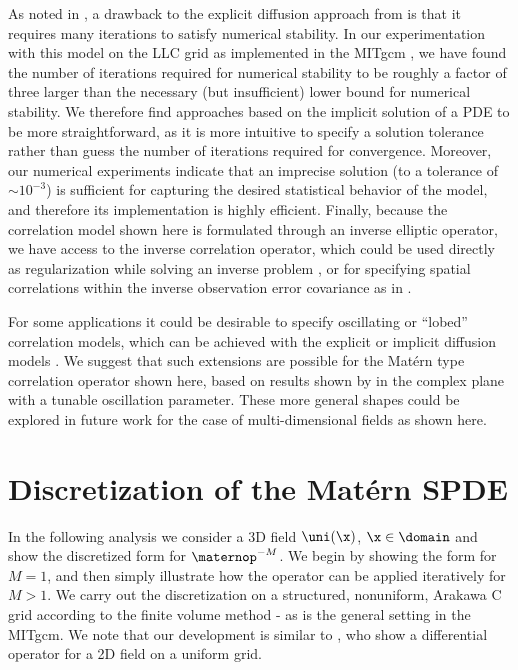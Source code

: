 \documentclass[alpha-refs]{wiley-article}
\begin{document}
As noted in \citet{mirouze_representation_2010,carrier_background-error_2010}, a
drawback to the explicit diffusion approach from
\citet{weaver_correlation_2001} is that it requires many iterations to satisfy
numerical stability.
In our experimentation with this model on the LLC grid
as implemented in the MITgcm \citep{campin_mitgcmmitgcm_2021}, we have found
the number of iterations required for numerical stability to be roughly a factor
of three larger than the necessary (but insufficient) lower bound for numerical
stability.
We therefore find approaches based on the implicit solution of a PDE to be more
straightforward, as it is more intuitive to specify a solution tolerance
rather than guess the number of iterations required for convergence.
Moreover, our numerical experiments indicate that
an imprecise solution (to a tolerance of $\sim10^{-3}$)
is sufficient for capturing the desired statistical behavior of the model,
and therefore its implementation is highly efficient.
Finally, because the correlation model shown here is formulated through an
inverse elliptic operator, we have access to the inverse correlation operator,
which could be used directly as regularization while solving an inverse problem
\citep[e.g.,][]{bui-thanh_computational_2013},
or for specifying spatial correlations within the inverse observation error
covariance as in \citet{guillet_modelling_2019}.

For some applications it could be desirable to specify oscillating or ``lobed''
correlation models, which can be achieved with the explicit or implicit
diffusion models \citep{weaver_correlation_2001,weaver_diffusion_2013}.
We suggest that such extensions are possible for the Mat\'ern type correlation
operator shown here, based on results shown by  in the
complex plane with a tunable oscillation parameter.
These more general shapes could be explored in future work for the case of
multi-dimensional fields as shown here.

\appendix
\section{Discretization of the Mat\'ern SPDE}
\label{sec:discretization_matern}

In the following analysis we consider a 3D field
$\uni(\x)$, $\x\in\domain$ and show the discretized form for $\maternop^{-M}$.
We begin by showing the form for $M=1$, and then simply illustrate how the
operator can be applied iteratively for $M>1$.
We carry out the discretization on a structured, nonuniform, Arakawa C
grid \citep{arakawa_computational_1977}
according to the finite volume method - as is the general setting in the MITgcm.
We note that our development is similar to \citet{fuglstad_exploring_2015},
who show a differential operator for a 2D field on a uniform grid.
\end{document}
